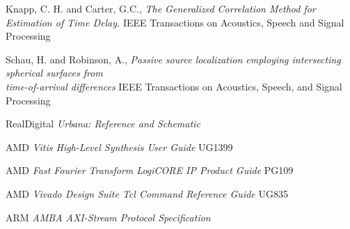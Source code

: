 \documentclass[a4paper,twocolumn]{article}
\begin{document}
\begin{thebibliography}{9}
  Knapp, C. H. and Carter, G.C., \emph{The Generalized Correlation
  Method for Estimation of Time Delay.} IEEE Transactions on Acoustics,
  Speech and Signal Processing

  Schau, H. and Robinson, A., \emph{Passive source localization
  employing intersecting spherical surfaces from\\
  time-of-arrival differences} IEEE Transactions on Acoustics, Speech, and Signal
  Processing

  RealDigital \emph{Urbana: Reference and Schematic}

  AMD \emph{Vitis High-Level Synthesis User Guide} UG1399

  AMD \emph{Fast Fourier Transform LogiCORE IP Product Guide} PG109

  AMD \emph{Vivado Design Suite Tcl Command Reference Guide} UG835

  ARM \emph{AMBA AXI-Stream Protocol Specification}
  
\end{thebibliography}
\end{document}
